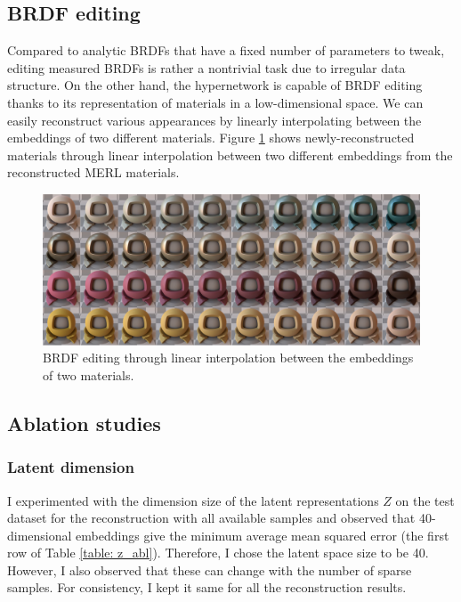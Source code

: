 \subsection{BRDF editing}\label{sec:brdf-editing}

Compared to analytic \gls{BRDF}s that have a fixed number of parameters to tweak, editing measured \gls{BRDF}s is rather a nontrivial task due to irregular data structure. On the other hand, the hypernetwork is capable of \gls{BRDF} editing thanks to its representation of materials in a low-dimensional space. We can easily reconstruct various appearances by linearly interpolating between the embeddings of two different materials. Figure \ref{fig:interpolation} shows newly-reconstructed materials through linear interpolation between two different embeddings from the reconstructed MERL materials. 


\begin{figure}[ht]
  \centering
   \includegraphics[width=\linewidth]{Chapters/hyperbrdf-figs/interpolation_extended.pdf}

   \caption{BRDF editing through linear interpolation between the embeddings of two materials.}
   \label{fig:interpolation}
\end{figure}

\subsection{Ablation studies}\label{sec:abl}
\subsubsection{Latent dimension}
I experimented with the dimension size of the latent representations $Z$ on the test dataset for the reconstruction with all available samples and observed that 40-dimensional embeddings give the minimum average mean squared error (the first row of Table \ref{table: z_abl}). Therefore, I chose the latent space size to be 40. However, I also observed that these can change with the number of sparse samples. For consistency, I kept it same for all the reconstruction results. 

